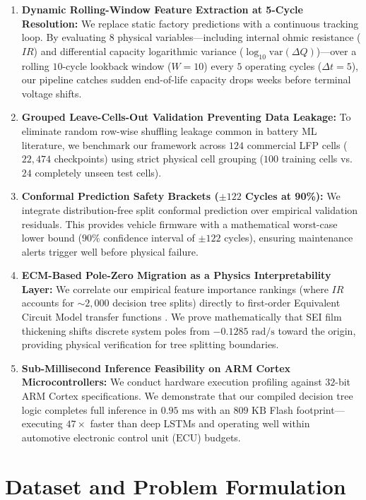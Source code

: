 \documentclass[journal,10pt]{IEEEtran}
\begin{document}
\begin{enumerate}
    \item \textbf{Dynamic Rolling-Window Feature Extraction at 5-Cycle Resolution:} We replace static factory predictions with a continuous tracking loop. By evaluating $8$ physical variables—including internal ohmic resistance ($IR$) and differential capacity logarithmic variance ($\log_{10}\text{var}(\Delta Q)$)—over a rolling $10$-cycle lookback window ($W=10$) every $5$ operating cycles ($\Delta t=5$), our pipeline catches sudden end-of-life capacity drops weeks before terminal voltage shifts.
    
    \item \textbf{Grouped Leave-Cells-Out Validation Preventing Data Leakage:} To eliminate random row-wise shuffling leakage common in battery ML literature, we benchmark our framework across $124$ commercial LFP cells ($22,474$ checkpoints) using strict physical cell grouping ($100$ training cells vs. $24$ completely unseen test cells).
    
    \item \textbf{Conformal Prediction Safety Brackets ($\pm 122$ Cycles at 90\%):} We integrate distribution-free split conformal prediction \cite{angelopoulos2021gentle, chen2022conformal} over empirical validation residuals. This provides vehicle firmware with a mathematical worst-case lower bound ($90\%$ confidence interval of $\pm 122$ cycles), ensuring maintenance alerts trigger well before physical failure.
    
    \item \textbf{ECM-Based Pole-Zero Migration as a Physics Interpretability Layer:} We correlate our empirical feature importance rankings (where $IR$ accounts for $\sim 2,000$ decision tree splits) directly to first-order Equivalent Circuit Model transfer functions \cite{zhao2023interpretable}. We prove mathematically that SEI film thickening shifts discrete system poles from $-0.1285\text{ rad/s}$ toward the origin, providing physical verification for tree splitting boundaries.
    
    \item \textbf{Sub-Millisecond Inference Feasibility on ARM Cortex Microcontrollers:} We conduct hardware execution profiling against $32$-bit ARM Cortex specifications. We demonstrate that our compiled decision tree logic completes full inference in $0.95\text{ ms}$ with an $809\text{ KB}$ Flash footprint—executing $47\times$ faster than deep LSTMs and operating well within automotive electronic control unit ($\text{ECU}$) budgets.
\end{enumerate}

\section{Dataset and Problem Formulation}



\end{document}
